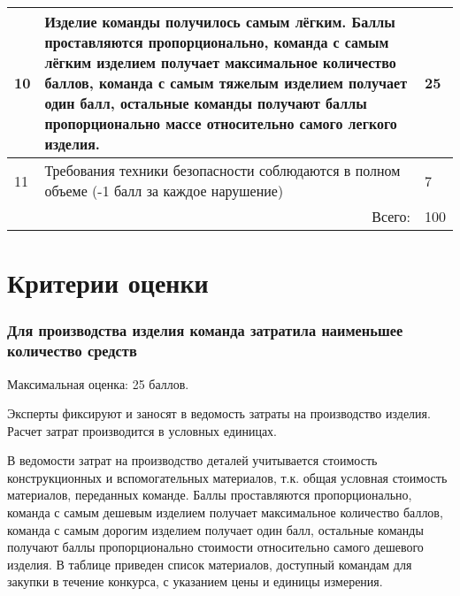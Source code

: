 \begin{table}[H]
\begin{center}
\begin{tabular}{|p{0.3cm}|p{13cm}|p{1.3cm}|}
        \hline
        10 & Изделие команды получилось самым лёгким. Баллы проставляются пропорционально, команда с самым лёгким изделием получает максимальное количество баллов, команда с самым тяжелым изделием получает один балл, остальные команды получают баллы пропорционально массе относительно самого легкого изделия. & 25 \\
        \hline
        11 & Требования техники безопасности соблюдаются в полном объеме   (-1 балл за каждое нарушение) & 7 \\
        \hline
        \multicolumn{2}{|r|}{Всего:} &	100 \\
        \hline
        \end{tabular}
    \end{center}
\end{table}

\section{Критерии оценки}

\subsubsection*{Для производства изделия команда затратила наименьшее количество средств}

Максимальная оценка: 25 баллов.

Эксперты фиксируют и заносят в ведомость затраты на производство изделия. Расчет затрат производится в условных единицах.

В ведомости затрат на производство деталей учитывается стоимость конструкционных и вспомогательных материалов, т.к. общая условная стоимость материалов, переданных команде. Баллы проставляются пропорционально, команда с самым дешевым изделием получает максимальное количество баллов, команда с самым дорогим изделием получает один балл, остальные команды получают баллы пропорционально стоимости относительно самого дешевого изделия. В таблице приведен список материалов, доступный командам для закупки в течение конкурса, с указанием цены и единицы измерения.

